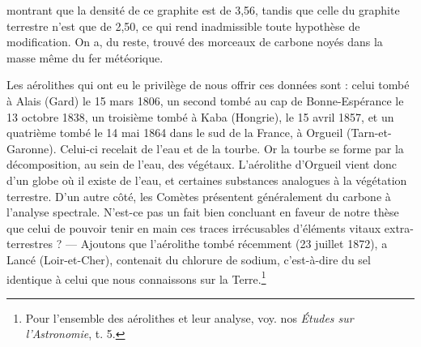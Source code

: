 \documentclass[a4paper, 11pt, oneside, landscape]{article}
\begin{document}
montrant que la densité de ce graphite est de 3,56, tandis que celle du graphite terrestre n'est que de 2,50, ce qui rend inadmissible toute hypothèse de modification. On a, du reste, trouvé des morceaux de carbone noyés dans la masse même du fer météorique.

Les aérolithes qui ont eu le privilège de nous offrir ces données sont : celui tombé à Alais (Gard) le 15 mars 1806, un second tombé au cap de Bonne-Espérance le 13 octobre 1838, un troisième tombé à Kaba (Hongrie), le 15 avril 1857, et un quatrième tombé le 14 mai 1864 dans le sud de la France, à Orgueil (Tarn-et-Garonne). Celui-ci recelait de l'eau et de la tourbe. Or la tourbe se forme par la décomposition, au sein de l'eau, des végétaux. L'aérolithe d'Orgueil vient donc d'un globe où il existe de l'eau, et certaines substances analogues à la végétation terrestre. D'un autre côté, les Comètes présentent généralement du carbone à l'analyse spectrale. N'est-ce pas un fait bien concluant en faveur de notre thèse que celui de pouvoir tenir en main ces traces irrécusables d'éléments vitaux extra-terrestres ? --- Ajoutons que l'aérolithe tombé récemment (23 juillet 1872), a Lancé (Loir-et-Cher), contenait du chlorure de sodium, c'est-à-dire du sel identique à celui que nous connaissons sur la Terre.\footnote{Pour l'ensemble des aérolithes et leur analyse, voy. nos \emph{Études sur l'Astronomie}, t. 5.}
\end{document}
